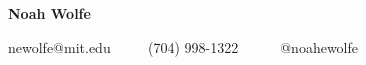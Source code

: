 \begin{center}

{\LARGE \textbf{Noah Wolfe}}

 newolfe@mit.edu\ \ \textbullet
\ \  (704) 998-1322 \ \ \textbullet
\ \  @noahewolfe \ \
\\
\end{center}